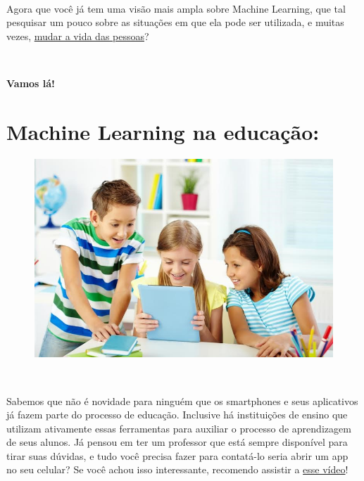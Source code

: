 \documentclass[12pt]{article}
\begin{document}
    
    \
    
    \
    
    \
    
    \
    
    \
    
    \
    
    \
    
    \
    
    \centering Agora que você já tem uma visão mais ampla sobre Machine Learning,
que tal pesquisar um pouco sobre as situações em que ela pode ser
utilizada, e muitas vezes, \href{https://www.deal.com.br/blog/7-maneiras-de-como-a-inteligencia-artificial-esta-mudando-nosso-dia-a-dia/}{mudar a vida das pessoas}?

\

    \centering \Large{\textbf{Vamos lá!}}
    
\large
            \section*{\centering Machine Learning na educação:}\label{sec:ML_Na_Educacao}
            
            \begin{figure}[ht]
            \centering
            \includegraphics[scale=0.6]{ldo-1.jpg}               
            \end{figure}
            
\
            
    Sabemos que não é novidade para ninguém que os smartphones e seus aplicativos já
fazem parte do processo de educação. Inclusive há instituições de ensino que utilizam ativamente
essas ferramentas para auxiliar o processo de aprendizagem de seus alunos.
Já pensou em ter um professor que está sempre disponível para tirar
suas dúvidas, e tudo você precisa fazer para contatá-lo seria abrir um
app no seu celular? Se você achou isso interessante, recomendo
assistir a \href{https://www.youtube.com/watch?v=Gjm1xgJVij4}{esse vídeo}!\\
\end{document}
